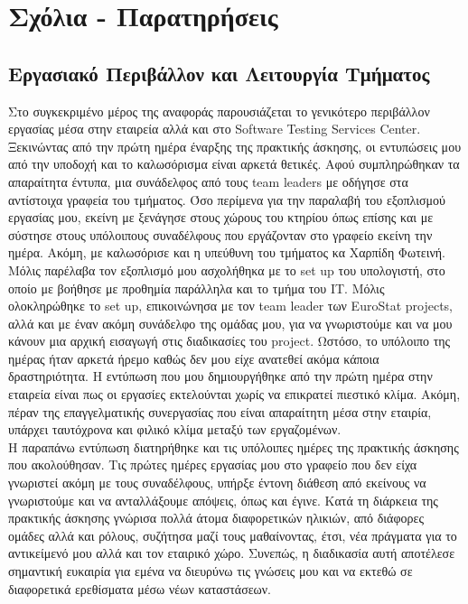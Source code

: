 \chapter{Σχόλια - Παρατηρήσεις}

\section{Εργασιακό Περιβάλλον και Λειτουργία Τμήματος}
Στο συγκεκριμένο μέρος της αναφοράς παρουσιάζεται το γενικότερο περιβάλλον εργασίας μέσα στην εταιρεία αλλά και στο Software Testing 
Services Center. Ξεκινώντας από την πρώτη ημέρα έναρξης της πρακτικής άσκησης, οι εντυπώσεις μου από την υποδοχή και το καλωσόρισμα είναι 
αρκετά θετικές. Αφού συμπληρώθηκαν τα απαραίτητα έντυπα, μια συνάδελφος από τους team leaders με οδήγησε στα αντίστοιχα γραφεία του τμήματος. 
Όσο περίμενα για την παραλαβή του εξοπλισμού εργασίας μου, εκείνη με ξενάγησε στους χώρους του κτηρίου όπως επίσης και με σύστησε στους υπόλοιπους 
συναδέλφους που εργάζονταν στο γραφείο εκείνη την ημέρα. Ακόμη, με καλωσόρισε και η υπεύθυνη του τμήματος κα Χαρπίδη Φωτεινή. 
Μόλις παρέλαβα τον εξοπλισμό μου ασχολήθηκα με το set up του υπολογιστή, στο οποίο με βοήθησε 
με προθημία παράλληλα και το τμήμα του ΙΤ. Μόλις ολοκληρώθηκε το set up, επικοινώνησα με τον team leader των EuroStat projects, αλλά και με έναν 
ακόμη συνάδελφο της ομάδας μου, για να γνωριστούμε και να μου κάνουν μια αρχική εισαγωγή στις διαδικασίες του project. Ωστόσο, το υπόλοιπο της ημέρας ήταν αρκετά ήρεμο 
καθώς δεν μου είχε ανατεθεί ακόμα κάποια δραστηριότητα. Η εντύπωση που μου δημιουργήθηκε από την πρώτη ημέρα στην εταιρεία είναι πως οι εργασίες εκτελούνται χωρίς να επικρατεί 
πιεστικό κλίμα. Ακόμη, πέραν της επαγγελματικής συνεργασίας που είναι απαραίτητη μέσα στην εταιρία, υπάρχει ταυτόχρονα και φιλικό κλίμα μεταξύ των εργαζομένων.\\

Η παραπάνω εντύπωση διατηρήθηκε και τις υπόλοιπες ημέρες της πρακτικής άσκησης που ακολούθησαν. Τις πρώτες ημέρες εργασίας μου στο γραφείο που δεν είχα γνωριστεί ακόμη με τους συναδέλφους, 
υπήρξε έντονη διάθεση από εκείνους να γνωριστούμε και να ανταλλάξουμε απόψεις, όπως και έγινε. Κατά τη διάρκεια της πρακτικής άσκησης γνώρισα πολλά άτομα διαφορετικών ηλικιών, από διάφορες ομάδες αλλά και ρόλους, 
συζήτησα μαζί τους μαθαίνοντας, έτσι, νέα πράγματα για το αντικείμενό μου αλλά και τον εταιρικό χώρο. Συνεπώς, η διαδικασία αυτή αποτέλεσε σημαντική ευκαιρία για εμένα να διευρύνω τις γνώσεις μου και 
να εκτεθώ σε διαφορετικά ερεθίσματα μέσω νέων καταστάσεων.\\

